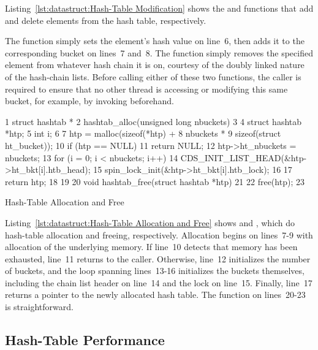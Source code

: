 Listing~\ref{lst:datastruct:Hash-Table Modification}
shows the  and  functions
that add and delete elements from the hash table, respectively.

The  function simply sets the element's hash
value on line~6, then adds it to the corresponding bucket on
lines~7 and~8.
The  function simply removes the specified element
from whatever hash chain it is on, courtesy of the doubly linked
nature of the hash-chain lists.
Before calling either of these two functions, the caller is required to
ensure that no other thread is accessing
or modifying this same bucket, for example, by invoking
 beforehand.

\begin{listing}[tb]
{ \scriptsize
\begin{verbbox}
 1 struct hashtab *
 2 hashtab_alloc(unsigned long nbuckets)
 3 {
 4   struct hashtab *htp;
 5   int i;
 6 
 7   htp = malloc(sizeof(*htp) +
 8                nbuckets *
 9                sizeof(struct ht_bucket));
10   if (htp == NULL)
11     return NULL;
12   htp->ht_nbuckets = nbuckets;
13   for (i = 0; i < nbuckets; i++) {
14     CDS_INIT_LIST_HEAD(&htp->ht_bkt[i].htb_head);
15     spin_lock_init(&htp->ht_bkt[i].htb_lock);
16   }
17   return htp;
18 }
19 
20 void hashtab_free(struct hashtab *htp)
21 {
22   free(htp);
23 }
\end{verbbox}
}
\centering
\theverbbox
\caption{Hash-Table Allocation and Free}
\label{lst:datastruct:Hash-Table Allocation and Free}
\end{listing}

Listing~\ref{lst:datastruct:Hash-Table Allocation and Free}
shows  and ,
which do hash-table allocation and freeing, respectively.
Allocation begins on lines~7-9 with allocation of the underlying memory.
If line~10 detects that memory has been exhausted, line~11 returns
 to the caller.
Otherwise, line~12 initializes the number of buckets, and the loop
spanning lines~13-16 initializes the buckets themselves,
including the chain list header on line~14 and the lock on line~15.
Finally, line~17 returns a pointer to the newly allocated hash table.
The  function on lines~20-23 is straightforward.

\subsection{Hash-Table Performance}
\label{sec:datastruct:Hash-Table Performance}

